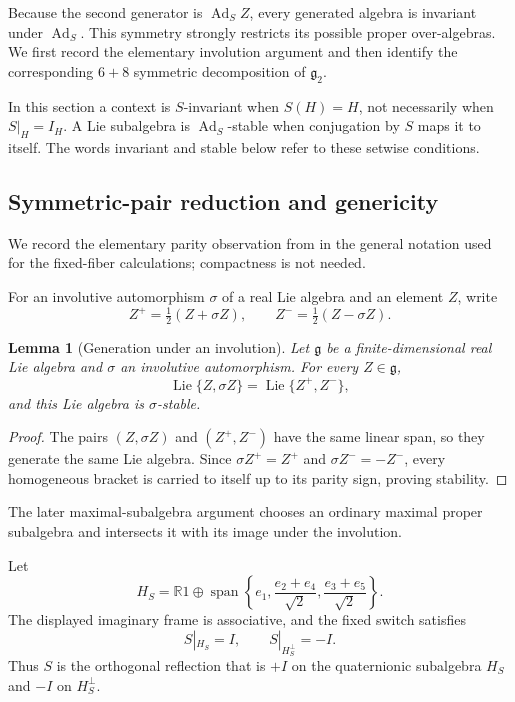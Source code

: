 \documentclass[11pt,a4paper]{article}
\newtheorem{lemma}[lemma]{Lemma}
\newcommand{\RR}{\mathbb R}
\newcommand{\Lie}{\operatorname{Lie}}
\newcommand{\Ad}{\operatorname{Ad}}
\newcommand{\Span}{\operatorname{span}}
\begin{document}
Because the second generator is $\Ad_SZ$, every generated algebra is invariant under $\Ad_S$.  This symmetry strongly restricts its possible proper over-algebras.  We first record the elementary involution argument and then identify the corresponding $6+8$ symmetric decomposition of $\mathfrak g_2$.

In this section a context is $S$-invariant when $S(H)=H$, not necessarily when $S|_H=I_H$.  A Lie subalgebra is $\operatorname{Ad}_S$-stable when conjugation by $S$ maps it to itself.  The words invariant and stable below refer to these setwise conditions.

\subsection{Symmetric-pair reduction and genericity}
We record the elementary parity observation from  in the general notation used for the fixed-fiber calculations; compactness is not needed.

For an involutive automorphism $\sigma$ of a real Lie algebra and an element $Z$, write
\[
Z^+=\tfrac12(Z+\sigma Z),\qquad Z^-=\tfrac12(Z-\sigma Z).
\]

\begin{lemma}[Generation under an involution]
\label{lem:general-symmetric-pair}
Let $\mathfrak g$ be a finite-dimensional real Lie algebra and $\sigma$ an involutive automorphism.  For every $Z\in\mathfrak g$,
\[
\Lie\{Z,\sigma Z\}=\Lie\{Z^+,Z^-\},
\]
and this Lie algebra is $\sigma$-stable.
\end{lemma}

\begin{proof}
The pairs $(Z,\sigma Z)$ and $(Z^+,Z^-)$ have the same linear span, so they generate the same Lie algebra.  Since $\sigma Z^+=Z^+$ and $\sigma Z^-=-Z^-$, every homogeneous bracket is carried to itself up to its parity sign, proving stability.
\end{proof}

The later maximal-subalgebra argument chooses an ordinary maximal proper subalgebra and intersects it with its image under the involution.

Let
\[
H_S=\RR1\oplus\Span\left\{e_1,\frac{e_2+e_4}{\sqrt2},\frac{e_3+e_5}{\sqrt2}\right\}.
\]
The displayed imaginary frame is associative, and the fixed switch satisfies
\[
S|_{H_S}=I,\qquad S|_{H_S^\perp}=-I.
\]
Thus $S$ is the orthogonal reflection that is $+I$ on the quaternionic subalgebra $H_S$ and $-I$ on $H_S^\perp$.
\end{document}

